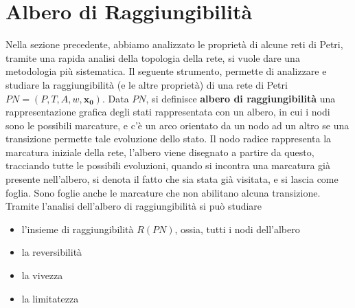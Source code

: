 \documentclass[10pt, letterpaper]{report}
\begin{document}
\section{Albero di Raggiungibilità}
Nella sezione precedente, abbiamo analizzato le proprietà di alcune reti di Petri, tramite una rapida analisi della topologia della rete, si vuole dare una metodologia più sistematica. Il seguente strumento, permette di analizzare e studiare la raggiungibilità (e le altre proprietà) di una rete di Petri $ PN=(P,T,A,w,\mathbf{x_0})$.\acc 
{} Data $PN$, si definisce \textbf{albero di raggiungibilità} una rappresentazione grafica degli stati rappresentata con un albero, in cui i nodi sono le possibili marcature, e c'è un arco orientato da un nodo ad un altro se una transizione permette tale evoluzione dello stato.\acc 
Il nodo radice rappresenta la marcatura iniziale della rete, l'albero viene disegnato a partire da questo, tracciando tutte le possibili evoluzioni, quando si incontra una marcatura già presente nell'albero, si denota il fatto che sia stata già visitata, e si lascia come foglia. Sono foglie anche le marcature che non abilitano alcuna transizione.\acc 
Tramite l'analisi dell'albero di raggiungibilità si può studiare\begin{itemize}
    \item l'insieme di raggiungibilità $R(PN)$, ossia, tutti i nodi dell'albero 
    \item la reversibilità 
    \item la vivezza 
    \item la limitatezza
\end{itemize}
\end{document}
